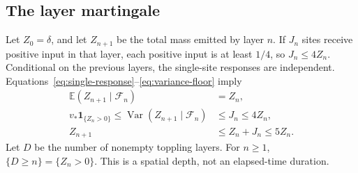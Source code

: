 \documentclass[11pt]{article}
\numberwithin{equation}{section}
\theoremstyle{definition}
\newcommand{\E}{\mathbb E}
\newcommand{\ind}{\mathbf 1}
\newcommand{\Var}{\operatorname{Var}}
\begin{document}
\subsection{The layer martingale}
Let $Z_0=\delta$, and let $Z_{n+1}$ be the total mass emitted by layer $n$. If $J_n$ sites receive positive input in that layer, each positive input is at least $1/4$, so $J_n\le4Z_n$. Conditional on the previous layers, the single-site responses are independent. Equations~\eqref{eq:single-response}--\eqref{eq:variance-floor} imply
\begin{align}
 \E(Z_{n+1}\mid\mathcal F_n)&=Z_n,\label{eq:layer-martingale}\\
 v_*\ind_{\{Z_n>0\}}\le\Var(Z_{n+1}\mid\mathcal F_n)&\le J_n\le4Z_n,\label{eq:layer-variance}\\
 Z_{n+1}&\le Z_n+J_n\le5Z_n.\label{eq:layer-overshoot}
\end{align}
Let $D$ be the number of nonempty toppling layers. For $n\ge1$, $\{D\ge n\}=\{Z_n>0\}$. This is a spatial depth, not an elapsed-time duration.
\end{document}
